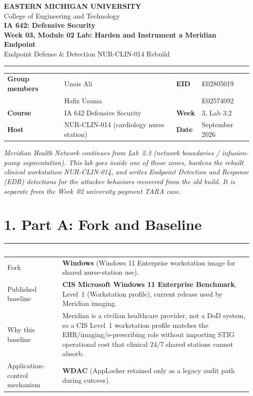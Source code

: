 \documentclass[11pt,letterpaper]{article}
\renewcommand{\arraystretch}{1.28}
\newcommand{\labtablesetup}{%
  \small
  \setlength{\tabcolsep}{6pt}%
  \renewcommand{\arraystretch}{1.45}%
}
\begin{document}
\begin{center}
{\large\textbf{EASTERN MICHIGAN UNIVERSITY}}\\[0.12em]
{\normalsize College of Engineering and Technology}\\[0.25em]
{\Large\textbf{IA 642: Defensive Security}}\\[0.15em]
{\large\textbf{Week 03, Module 02 Lab: Harden and Instrument a Meridian Endpoint}}\\[0.2em]
{\small Endpoint Defense \& Detection \quad\textbullet\quad NUR-CLIN-014 Rebuild}
\end{center}

\vspace{0.35em}\hrule\vspace{0.45em}

\begin{tabularx}{\textwidth}{@{}L{3.2cm}Y L{2.0cm}Y@{}}
\textbf{Group members} & Unais Ali & \textbf{EID} & E02805019 \\
 & Hafiz Usama &  & E02574092 \\
\textbf{Course} & IA 642 Defensive Security & \textbf{Week} & 3, Lab 3.2 \\
\textbf{Host} & NUR-CLIN-014 (cardiology nurse station) & \textbf{Date} & September 2026 \\
\end{tabularx}

\vspace{0.35em}
\textit{Meridian Health Network continues from Lab~2.3 (network boundaries / infusion-pump segmentation). This lab goes inside one of those zones, hardens the rebuilt clinical workstation NUR-CLIN-014, and writes Endpoint Detection and Response (EDR) detections for the attacker behaviors recovered from the old build. It is separate from the Week~02 university payment TARA case.}

\section*{1. Part A: Fork and Baseline}

\begingroup\labtablesetup
{}
\begin{tabularx}{\textwidth}{@{}L{3.4cm}Y@{}}
\toprule
{}
\textcolor{white}{\textbf{Question}} & \textcolor{white}{\textbf{Answer}} \\
\midrule
{}
Fork & \textbf{Windows} (Windows 11 Enterprise workstation image for shared nurse-station use). \\
Published baseline & \textbf{CIS Microsoft Windows 11 Enterprise Benchmark}, Level~1 (Workstation profile), current release used by Meridian imaging. \\
Why this baseline & Meridian is a civilian healthcare provider, not a DoD system, so a CIS Level~1 workstation profile matches the EHR/imaging/e-prescribing role without importing STIG operational cost that clinical 24/7 shared stations cannot absorb. \\
Application-control mechanism & \textbf{WDAC} (AppLocker retained only as a legacy audit path during cutover). \\
\bottomrule
\end{tabularx}
\endgroup
\end{document}
